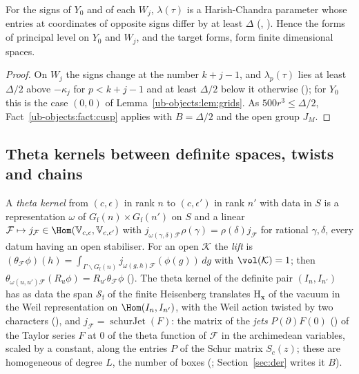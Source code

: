 \begin{proposition}\label{ub-objects:prop:finite}
For the signs of $Y_0$ and of each $W_j$, $\lambda(\tau)$ is a Harish-Chandra parameter whose
entries at coordinates of opposite signs differ by at least $\Delta$ (, ).
Hence the forms of principal level on $Y_0$ and $W_j$, and the target forms, form finite
dimensional spaces.
\end{proposition}

\begin{proof}
On $W_j$ the signs change at the number $k+j-1$, and $\lambda_p(\tau)$ lies at least $\Delta/2$ above
$-\kappa_j$ for $p<k+j-1$ and at least $\Delta/2$ below it otherwise
(); for $Y_0$ this is the case $(0,0)$ of
Lemma~\ref{ub-objects:lem:grids}. As $500r^3\le\Delta/2$, Fact~\ref{ub-objects:fact:cusp} applies
with $B=\Delta/2$ and the open group $J_M$.
\end{proof}

\subsection{Theta kernels between definite spaces, twists and chains}\label{ub-objects:sec:kernels}

\begin{definition}
\label{ub-objects:def:kernel}
A \emph{theta kernel} from $(c,\epsilon)$ in rank $n$ to $(c,\epsilon')$ in rank $n'$ with data in $S$ is a
representation $\omega$ of $G_{\mathrm f}(n)\times G_{\mathrm f}(n')$ on $S$ and a linear $\mathcal F\mapsto j_{\mathcal F}\in
\Hom(\mathbb V_{c,\epsilon},\mathbb V_{c,\epsilon'})$ with $j_{\omega(\gamma,\delta)\mathcal F}\rho(\gamma)=\rho(\delta)j_{\mathcal F}$ for
rational $\gamma,\delta$, every datum having an open stabiliser. For an open $\mathcal K$ the \emph{lift} is
$(\theta_{\mathcal F}\phi)(h)=\int_{\Gamma\backslash G_{\mathrm f}(n)}j_{\omega(g,h)\mathcal F}(\phi(g))\,dg$ with
$\vol(\mathcal K)=1$; then $\theta_{\omega(u,u')\mathcal F}(R_u\phi)=R_{u'}\theta_{\mathcal F}\phi$
(). The theta kernel of the definite pair $(I_n,I_{n'})$ has as
data the span $\mathscr S_{\mathrm f}$ of the finite Heisenberg translates $\mathrm H_{\mathbf x}$ of the vacuum in the
Weil representation on $\Hom(I_n,I_{n'})$, with the Weil action twisted by two characters
(), and $j_{\mathcal F}=\operatorname{schurJet}(F)$: the matrix of the
\emph{jets} $P(\partial)F(0)$ () of the Taylor series $F$ at $0$ of the theta function
of $\mathcal F$ in the archimedean variables, scaled by a constant, along the entries $P$ of the Schur matrix
$S_c(z)$; these are homogeneous of degree $L$, the number of boxes (; Section~\ref{sec:der} writes
it $B$).
\end{definition}


